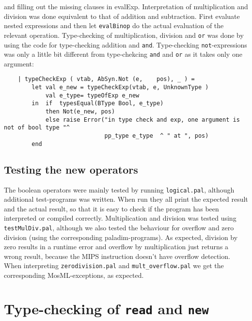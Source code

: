 \documentclass{article}
\begin{document}
and filling out the missing clauses in evalExp.
Interpretation of multiplication and division was done equivalent to that of addition and subtraction. First evaluate nested expressions and then let \texttt{evalBinop} do the actual evaluation of the relevant operation.
Type-checking of multiplication, division and \texttt{or} was done by using the code for type-checking addition and \texttt{and}. Type-checking \texttt{not}-expressions was only a little bit different from type-chekcing \texttt{and} and \texttt{or} as it takes only one argument:
\begin{lstlisting}
    | typeCheckExp ( vtab, AbSyn.Not (e,    pos), _ ) =
        let val e_new = typeCheckExp(vtab, e, UnknownType )
            val e_type= typeOfExp e_new
        in  if  typesEqual(BType Bool, e_type)
            then Not(e_new, pos)
            else raise Error("in type check and exp, one argument is not of bool type "^
                             pp_type e_type  ^ " at ", pos)
        end
\end{lstlisting}

\subsection{Testing the new operators}
The boolean operators were mainly tested by running \texttt{logical.pal}, although additional
test-programs was written. When run they all print the expected result and the actual result,
so that it is easy to check if the program has been interpreted or compiled correctly.
Multiplication and division was tested using \texttt{testMulDiv.pal}, although we also tested
the behaviour for overflow and zero division (using the corresponding paladim-programs). As
expected, division by zero results in a runtime error and overflow by multiplication just
returns a wrong result, because the MIPS instruction doesn't have overflow detection. When
interpreting \texttt{zerodivision.pal} and \texttt{mult\_overflow.pal} we get the corresponding
MosML-exceptions, as expected.
\section{Type-checking of \texttt{read} and \texttt{new}}
\end{document}
